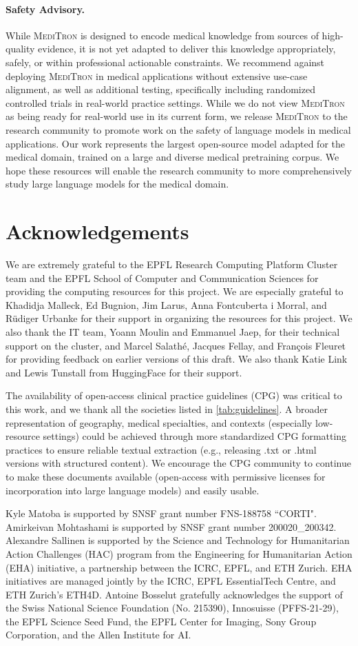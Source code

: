 \documentclass{article}
\newcommand{\mtron}{\textsc{MediTron}\xspace}
\newcommand{\safetystatement}{While \mtron is designed to encode medical knowledge from sources of high-quality evidence, it is not yet adapted to deliver this knowledge appropriately, safely, or within professional actionable constraints. We recommend against deploying \mtron in medical applications without extensive use-case alignment, as well as additional testing, specifically including randomized controlled trials in real-world practice settings.}
\begin{document}
\paragraph{Safety Advisory.} \safetystatement{} While we do not view \mtron as being ready for real-world use in its current form, we release \mtron to the research community to promote work on the safety of language models in medical applications. Our work represents the largest open-source model adapted for the medical domain, trained on a large and diverse medical pretraining corpus. We hope these resources will enable the research community to more comprehensively study large language models for the medical domain. 
\section*{Acknowledgements}

We are extremely grateful to the EPFL Research Computing Platform Cluster team and the EPFL School of Computer and Communication Sciences for providing the computing resources for this project. We are especially grateful to Khadidja Malleck, Ed Bugnion, Jim Larus, Anna Fontcuberta i Morral, and Rüdiger Urbanke for their support in organizing the resources for this project. 
We also thank the IT team, Yoann Moulin and Emmanuel Jaep, for their technical support on the cluster, and Marcel Salathé, Jacques Fellay, and François Fleuret for providing feedback on earlier versions of this draft. We also thank Katie Link and Lewis Tunstall from HuggingFace for their support.

The availability of open-access clinical practice guidelines (CPG) was critical to this work, and we thank all the societies listed in \autoref{tab:guidelines}. A broader representation of geography, medical specialties, and contexts (especially low-resource settings) could be achieved through more standardized CPG formatting practices to ensure reliable textual extraction (e.g., releasing .txt or .html versions with structured content). We encourage the CPG community to continue to make these documents available (open-access with permissive licenses for incorporation into large language models) and easily usable. 

Kyle Matoba is supported by SNSF grant number FNS-188758 “CORTI".
Amirkeivan Mohtashami is supported by SNSF grant number 200020\_200342.
Alexandre Sallinen is supported by the Science and Technology for Humanitarian Action Challenges (HAC) program from the Engineering for Humanitarian Action (EHA) initiative, a partnership between the ICRC, EPFL, and ETH Zurich. EHA initiatives are managed jointly by the ICRC, EPFL EssentialTech Centre, and ETH Zurich's ETH4D.
Antoine Bosselut gratefully acknowledges the support of the Swiss National Science Foundation (No. 215390), Innosuisse (PFFS-21-29), the EPFL Science Seed Fund, the EPFL Center for Imaging, Sony Group Corporation, and the Allen Institute for AI.
\end{document}
